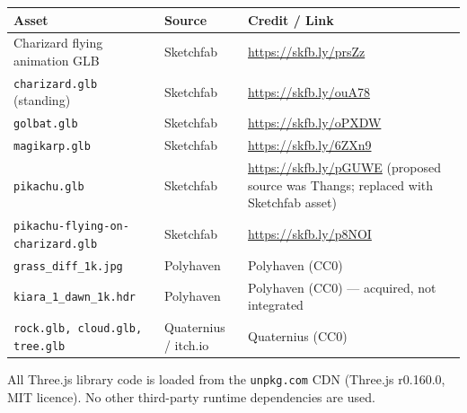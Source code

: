 \documentclass[11pt,a4paper]{article}
\begin{document}
\begin{tabular}{@{} L{4.2cm} L{2.8cm} L{6.5cm} @{}}
\toprule
\textbf{Asset} & \textbf{Source} & \textbf{Credit / Link} \\
\midrule
Charizard flying animation GLB
  & Sketchfab
  & \url{https://skfb.ly/prsZz} \\[4pt]
\texttt{charizard.glb} (standing)
  & Sketchfab
  & \url{https://skfb.ly/ouA78} \\[4pt]
\texttt{golbat.glb}
  & Sketchfab
  & \url{https://skfb.ly/oPXDW} \\[4pt]
\texttt{magikarp.glb}
  & Sketchfab
  & \url{https://skfb.ly/6ZXn9} \\[4pt]
\texttt{pikachu.glb}
  & Sketchfab
  & \url{https://skfb.ly/pGUWE}
    (proposed source was Thangs; replaced with Sketchfab asset) \\[4pt]
\texttt{pikachu-flying-on-charizard.glb}
  & Sketchfab
  & \url{https://skfb.ly/p8NOI} \\[4pt]
\texttt{grass\_diff\_1k.jpg}
  & Polyhaven
  & Polyhaven (CC0) \\[4pt]
\texttt{kiara\_1\_dawn\_1k.hdr}
  & Polyhaven
  & Polyhaven (CC0) --- acquired, not integrated \\[4pt]
\texttt{rock.glb, cloud.glb, tree.glb}
  & Quaternius / itch.io
  & Quaternius (CC0) \\
\bottomrule
\end{tabular}

\medskip
All Three.js library code is loaded from the \texttt{unpkg.com} CDN
(Three.js r0.160.0, MIT licence). No other third-party runtime dependencies
are used.
\end{document}
